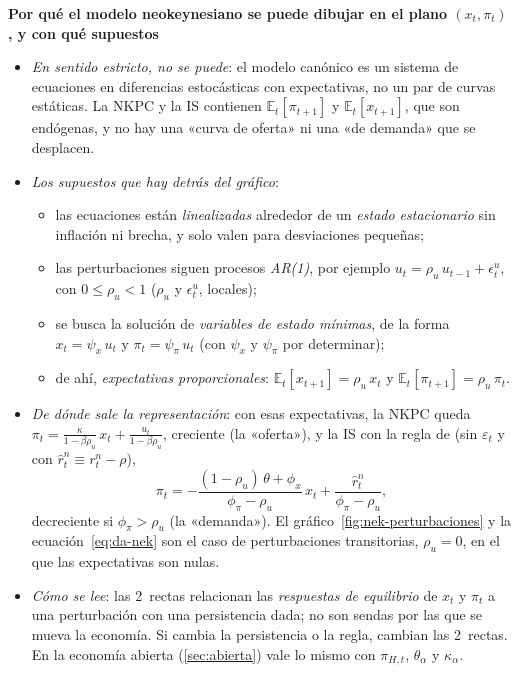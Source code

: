 \documentclass[11pt]{article}
\begin{document}
\begin{anotaciones}
\textbf{Por qué el modelo neokeynesiano se puede dibujar en el plano $(x_t,\pi_t)$, y con qué supuestos}
\begin{itemize}
\item \emph{En sentido estricto, no se puede}: el modelo canónico es un sistema de ecuaciones en diferencias estocásticas con expectativas, no un par de curvas estáticas. La NKPC y la IS contienen $\mathbb{E}_t[\pi_{t+1}]$ y $\mathbb{E}_t[x_{t+1}]$, que son endógenas, y no hay una «curva de oferta» ni una «de demanda» que se desplacen.
\item \emph{Los supuestos que hay detrás del gráfico}:
  \begin{itemize}
  \item las ecuaciones están \emph{linealizadas} alrededor de un \emph{estado estacionario} sin inflación ni brecha, y solo valen para desviaciones pequeñas;
  \item las perturbaciones siguen procesos \emph{AR(1)}, por ejemplo $u_t=\rho_u\,u_{t-1}+\epsilon^u_t$, con $0\leq\rho_u<1$ ($\rho_u$ y $\epsilon^u_t$, locales);
  \item se busca la solución de \emph{variables de estado mínimas}, de la forma $x_t=\psi_x\,u_t$ y $\pi_t=\psi_\pi\,u_t$ (con $\psi_x$ y $\psi_\pi$ por determinar);
  \item de ahí, \emph{expectativas proporcionales}: $\mathbb{E}_t[x_{t+1}]=\rho_u\,x_t$ y $\mathbb{E}_t[\pi_{t+1}]=\rho_u\,\pi_t$.
  \end{itemize}
\item \emph{De dónde sale la representación}: con esas expectativas, la NKPC queda $\pi_t=\frac{\kappa}{1-\beta\rho_u}\,x_t+\frac{u_t}{1-\beta\rho_u}$, creciente (la «oferta»), y la IS con la regla de  (sin $\varepsilon_t$ y con $\hat r^n_t\equiv r^n_t-\rho$),
  \begin{equation*}
  \pi_t=-\frac{(1-\rho_u)\,\theta+\phi_x}{\phi_\pi-\rho_u}\,x_t+\frac{\hat r^n_t}{\phi_\pi-\rho_u},
  \end{equation*}
  decreciente si $\phi_\pi>\rho_u$ (la «demanda»). El gráfico~\ref{fig:nek-perturbaciones} y la ecuación~\eqref{eq:da-nek} son el caso de perturbaciones transitorias, $\rho_u=0$, en el que las expectativas son nulas.
\item \emph{Cómo se lee}: las 2~rectas relacionan las \emph{respuestas de equilibrio} de $x_t$ y $\pi_t$ a una perturbación con una persistencia dada; no son sendas por las que se mueva la economía. Si cambia la persistencia o la regla, cambian las 2~rectas. En la economía abierta (\ref{sec:abierta}) vale lo mismo con $\pi_{H,t}$, $\theta_\alpha$ y $\kappa_\alpha$.
\end{itemize}
\end{anotaciones}
\end{document}
